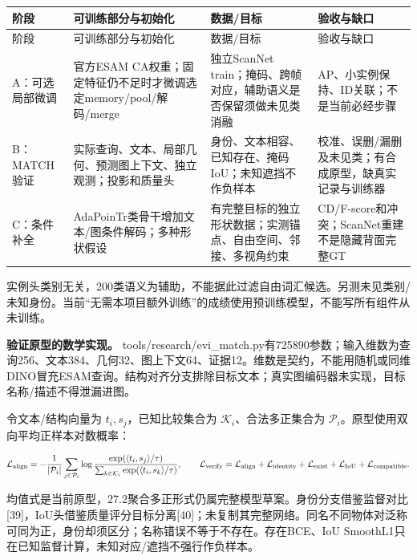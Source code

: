 \documentclass[UTF8,fontset=fandol]{ctexart}
\begin{document}
{\small
\begin{longtable}{|p{}|p{}|p{}|p{}|}
\hline
阶段 & 可训练部分与初始化 & 数据/目标 & 验收与缺口 \\ \hline
\endfirsthead
\hline
阶段 & 可训练部分与初始化 & 数据/目标 & 验收与缺口 \\ \hline
\endhead
A：可选局部微调 & 官方ESAM CA权重；固定特征仍不足时才微调选定memory/pool/解码/merge & 独立ScanNet train；掩码、跨帧对应，辅助语义是否保留须做未见类消融 & AP、小实例保持、ID关联；不是当前必经步骤 \\ \hline
B：MATCH验证 & 实际查询、文本、局部几何、预测图上下文、独立观测；投影和质量头 & 身份、文本相容、已知存在、掩码IoU；未知遮挡不作负样本 & 校准、误删/漏删及未见类；有合成原型，缺真实记录与训练器 \\ \hline
C：条件补全 & AdaPoinTr类骨干增加文本/图条件解码；多种形状假设 & 有完整目标的独立形状数据；实测锚点、自由空间、邻接、多视角约束 & CD/F-score和冲突；ScanNet重建不是隐藏背面完整GT \\ \hline
\end{longtable}
}

实例头类别无关，200类语义为辅助，不能据此过滤自由词汇候选。另测未见类别/未知身份。当前“无需本项目额外训练”的成绩使用预训练模型，不能写所有组件从未训练。



\textbf{验证原型的数学实现。} tools/research/evi\_match.py有725890参数；输入维数为查询256、文本384、几何32、图上下文64、证据12。维数是契约，不能用随机或同维DINO冒充ESAM查询。结构对齐分支排除目标文本；真实图编码器未实现，目标名称/描述不得泄漏进图。



令文本/结构向量为 $t_i,s_j$，已知比较集合为 $\mathcal K_i$、合法多正集合为 $\mathcal P_i$。原型使用双向平均正样本对数概率：



\[
\mathcal L_{\rm align}
=-\frac1{|\mathcal P_i|}\sum_{j\in\mathcal P_i}
\log\frac{\exp(\langle t_i,s_j\rangle/\tau)}
{\sum_{k\in\mathcal K_i}\exp(\langle t_i,s_k\rangle/\tau)},\qquad
\mathcal L_{\rm verify}
=\mathcal L_{\rm align}+\mathcal L_{\rm identity}
+\mathcal L_{\rm exist}+\mathcal L_{\rm IoU}+\mathcal L_{\rm compatible}.
\]

均值式是当前原型，27.2聚合多正形式仍属完整模型草案。身份分支借鉴监督对比[39]，IoU头借鉴质量评分目标分离[40]；未复制其完整网络。同名不同物体对泛称可同为正，身份却须区分；名称错误不等于不存在。存在BCE、IoU SmoothL1只在已知监督计算，未知对应/遮挡不强行作负样本。
\end{document}
